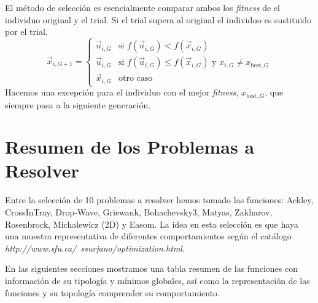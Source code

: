 \documentclass{article}
\begin{document}
El método de selección es esencialmente comparar ambos los \textit{fitness} de el individuo original y el trial. Si el trial supera al original el individuo es sustituido por el trial.
\begin{equation}
    \vec{x}_{i,G+1} = \left\{\begin{array}{cl}
            \vec{u}_{i,G}&\text{si }f(\vec{u}_{i,G})<f(\vec{x}_{i,G})\\
            \vec{u}_{i,G}&\text{si }f(\vec{u}_{i,G})\le f(\vec{x}_{i,G})\text{ y }x_{i, G}\neq x_{\text{best}, G}\\
            \vec{x}_{i,G}&\text{otro caso}
        \end{array}\right.
\label{ec_seleccion}
\end{equation}
Hacemos una excepción para el individuo con el mejor \textit{fitness}, $x_{\text{best},G}$, que siempre pasa a la siguiente generación.

\section{Resumen de los Problemas a Resolver}
Entre la selección de 10 problemas a resolver hemos tomado las funciones: Ackley, CrossInTray, Drop-Wave, Griewank, Bohachevsky3, Matyas, Zakharov, Rosenbrock, Michalewicz (2D) y Easom. La idea en esta selección es que haya una muestra representativa de diferentes comportamientos según el catálogo \textit{http://www.sfu.ca/~ssurjano/optimization.html}.

En las siguientes secciones mostramos una tabla resumen de las funciones con información de su tipología y mínimos globales, así como la representación de las funciones y su topología comprender su comportamiento.
\end{document}
